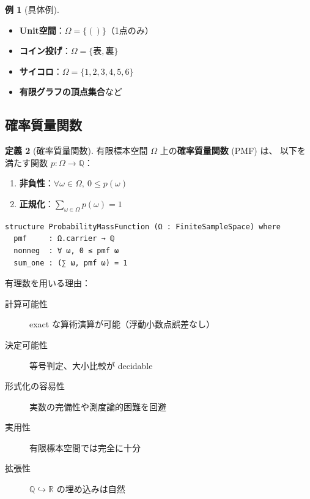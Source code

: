 \documentclass[a4paper,12pt]{ltjsarticle}
\theoremstyle{definition}
\newtheorem{definition}{定義}[section]
\newtheorem{example}[definition]{例}
\begin{document}
\begin{example}[具体例]
\begin{itemize}
  \item \textbf{Unit空間}：$\Omega = \{()\}$（1点のみ）
  \item \textbf{コイン投げ}：$\Omega = \{\text{表}, \text{裏}\}$
  \item \textbf{サイコロ}：$\Omega = \{1,2,3,4,5,6\}$
  \item \textbf{有限グラフの頂点集合}など
\end{itemize}
\end{example}

\subsection{確率質量関数}

\begin{definition}[確率質量関数]
有限標本空間 $\Omega$ 上の\textbf{確率質量関数} (PMF) は、
以下を満たす関数 $p : \Omega \to \mathbb{Q}$：
\begin{enumerate}
  \item \textbf{非負性}：$\forall \omega \in \Omega,\ 0 \leq p(\omega)$
  \item \textbf{正規化}：$\sum_{\omega \in \Omega} p(\omega) = 1$
\end{enumerate}
\end{definition}

\begin{codebox}
\begin{verbatim}
structure ProbabilityMassFunction (Ω : FiniteSampleSpace) where
  pmf     : Ω.carrier → ℚ
  nonneg  : ∀ ω, 0 ≤ pmf ω
  sum_one : (∑ ω, pmf ω) = 1
\end{verbatim}
\end{codebox}

\begin{conceptbox}
有理数を用いる理由：
\begin{description}
  \item[計算可能性] exact な算術演算が可能（浮動小数点誤差なし）
  \item[決定可能性] 等号判定、大小比較が decidable
  \item[形式化の容易性] 実数の完備性や測度論的困難を回避
  \item[実用性] 有限標本空間では完全に十分
  \item[拡張性] $\mathbb{Q} \hookrightarrow \mathbb{R}$ の埋め込みは自然
\end{description}
\end{conceptbox}
\end{document}
